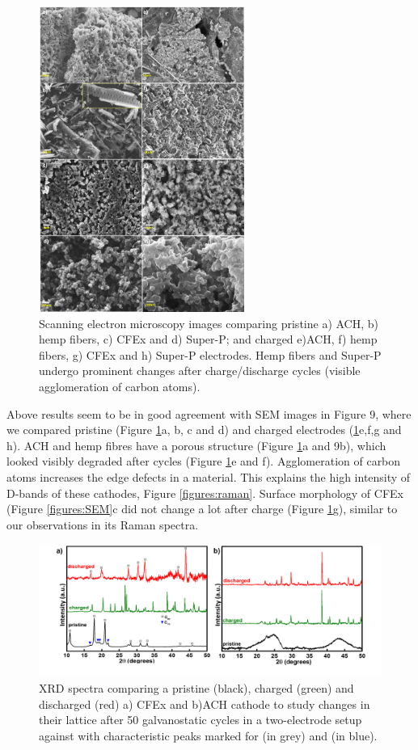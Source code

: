 \begin{figure}[tbh!]
  \centering
  \includegraphics[width=0.6\textwidth]{Figures/chap5fig/SEM}
    \caption{Scanning electron microscopy images comparing pristine a) ACH, b) hemp fibers, c) CFEx and d) Super-P; and charged e)ACH, f) hemp fibers, g) CFEx and h) Super-P electrodes. Hemp fibers and Super-P undergo prominent changes after charge/discharge cycles (visible agglomeration of carbon atoms).}
  \label{Figures/chap5fig:SEM}
\end{figure}
Above results seem to be in good agreement with SEM images in Figure 9, where we compared pristine (Figure \ref{Figures/chap5fig:SEM}a, b, c and d) and charged electrodes (\ref{Figures/chap5fig:SEM}e,f,g and h). ACH and hemp fibres have a porous structure (Figure \ref{Figures/chap5fig:SEM}a and 9b), which looked visibly degraded after cycles (Figure \ref{Figures/chap5fig:SEM}e and f). Agglomeration of carbon atoms increases the edge defects in a material. This explains the high intensity of D-bands of these cathodes, Figure \ref{figures:raman}. Surface morphology of CFEx (Figure \ref{figures:SEM}c did not change a lot after charge (Figure \ref{Figures/chap5fig:SEM}g), similar to our observations in its Raman spectra. 
\begin{figure}[tbh!]
  \centering
  \includegraphics[width=\textwidth]{Figures/chap5fig/xrd}
    \caption{XRD spectra comparing a pristine (black), charged (green) and discharged (red) a) CFEx and b)ACH cathode to study changes in their lattice after 50 galvanostatic cycles in a two-electrode setup against  with characteristic peaks marked for  (in grey) and  (in blue).}
  \label{Figures/chap5fig:xrd}
\end{figure}
